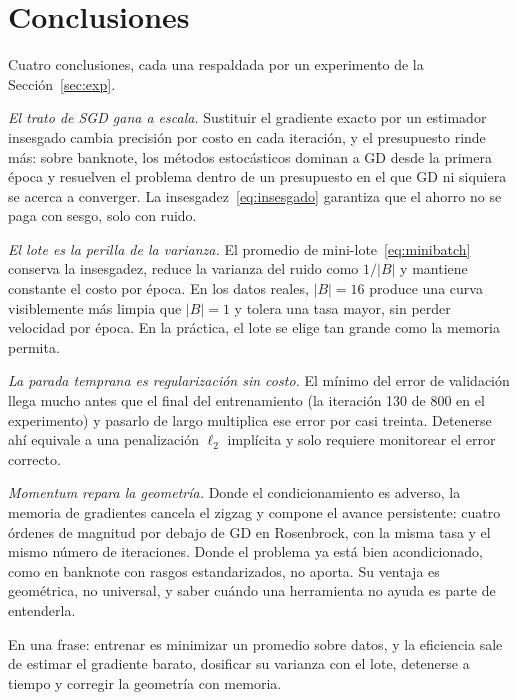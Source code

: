 \section{Conclusiones}\label{sec:concl}

Cuatro conclusiones, cada una respaldada por un experimento de la Sección~\ref{sec:exp}.

\emph{El trato de SGD gana a escala.} Sustituir el gradiente exacto por un estimador insesgado cambia precisión por costo en cada iteración, y el presupuesto rinde más: sobre banknote, los métodos estocásticos dominan a GD desde la primera época y resuelven el problema dentro de un presupuesto en el que GD ni siquiera se acerca a converger. La insesgadez~\eqref{eq:insesgado} garantiza que el ahorro no se paga con sesgo, solo con ruido.

\emph{El lote es la perilla de la varianza.} El promedio de mini-lote~\eqref{eq:minibatch} conserva la insesgadez, reduce la varianza del ruido como $1/|B|$ y mantiene constante el costo por época. En los datos reales, $|B| = 16$ produce una curva visiblemente más limpia que $|B| = 1$ y tolera una tasa mayor, sin perder velocidad por época. En la práctica, el lote se elige tan grande como la memoria permita.

\emph{La parada temprana es regularización sin costo.} El mínimo del error de validación llega mucho antes que el final del entrenamiento (la iteración 130 de 800 en el experimento) y pasarlo de largo multiplica ese error por casi treinta. Detenerse ahí equivale a una penalización $\ell_2$ implícita y solo requiere monitorear el error correcto.

\emph{Momentum repara la geometría.} Donde el condicionamiento es adverso, la memoria de gradientes cancela el zigzag y compone el avance persistente: cuatro órdenes de magnitud por debajo de GD en Rosenbrock, con la misma tasa y el mismo número de iteraciones. Donde el problema ya está bien acondicionado, como en banknote con rasgos estandarizados, no aporta. Su ventaja es geométrica, no universal, y saber cuándo una herramienta no ayuda es parte de entenderla.

En una frase: entrenar es minimizar un promedio sobre datos, y la eficiencia sale de estimar el gradiente barato, dosificar su varianza con el lote, detenerse a tiempo y corregir la geometría con memoria.
